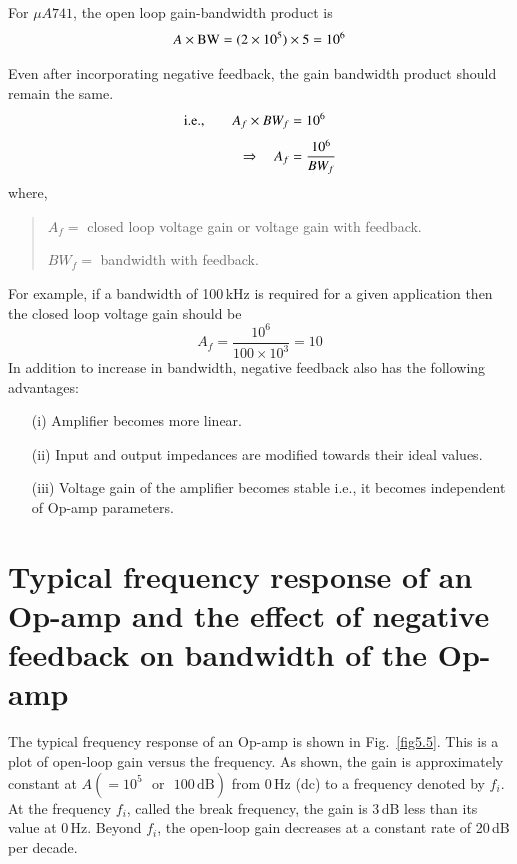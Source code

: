 For $\mu A741$, the open loop gain-bandwidth product is
$$
A\times {\rm BW} = (2\times 10^{5})\times 5=10^{6}
$$

Even after incorporating negative feedback, the gain bandwidth product should remain the same.
\begin{align}
\text{i.e.,}\qquad A_{f}\times BW_{f} &= 10^{6}\notag\\[3pt]
\Rightarrow\quad A_{f} &= \frac{10^{6}}{BW_{f}}\label{eq5.5}
\end{align}
where,
\begin{quote}
$A_{f}=$ closed loop voltage gain or voltage gain with feedback.

$BW_{f}=$ bandwidth with feedback.
\end{quote}

For example, if a bandwidth of 100\,kHz is required for a given application then the closed loop voltage gain should be
$$
A_{f}=\frac{10^{6}}{100\times 10^{3}}=10
$$
In addition to increase in bandwidth, negative feedback also has the following advantages:
\begin{itemize}
\item[(i)] Amplifier becomes more linear.

\item[(ii)] Input and output impedances are modified towards their ideal values.

\item[(iii)] Voltage gain of the amplifier becomes stable i.e., it becomes independent of Op-amp parameters.
\end{itemize}

\section{Typical frequency response of an Op-amp and the effect of negative feedback on bandwidth of the Op-amp}\label{sec5.3}

The typical frequency response of an Op-amp is shown in Fig.~\ref{fig5.5}. This is a plot of open-loop gain versus the frequency. As shown, the gain is approximately constant at $A(=10^{5}\text{~ or~ }100\,\text{dB})$ from 0\,Hz (dc) to a frequency denoted by $f_{i}$. At the frequency $f_{i}$, called the break frequency, the gain is 3\,dB less than its value at 0\,Hz. Beyond $f_{i}$, the open-loop gain decreases at a constant rate of 20\,dB per decade.

\eject

